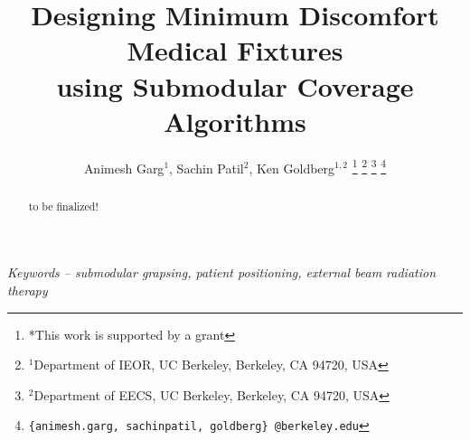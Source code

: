 \documentclass[letterpaper, 10 pt, conference]{ieeeconf}  %
\title{\LARGE \bf
Designing Minimum Discomfort Medical Fixtures \\
using Submodular Coverage Algorithms 
}
\author{Animesh Garg$^{1}$, Sachin Patil$^{2}$, Ken Goldberg$^{1,2}$%
\thanks{*This work is supported by a grant}%
\thanks{$^{1}$Department of IEOR, UC Berkeley,
	Berkeley, CA 94720, USA}%
\thanks{$^{2}$Department of EECS, UC Berkeley,
        Berkeley, CA 94720, USA}%
\thanks{{\tt\small \{animesh.garg, sachinpatil, goldberg\} @berkeley.edu}}%
}
\begin{document}
\maketitle
\thispagestyle{empty}
\pagestyle{empty}


\begin{abstract}
to be finalized!
\end{abstract}

\noindent \textit{ Keywords -- submodular grapsing, patient positioning, 
external beam radiation therapy}










\addtolength{\textheight}{-12cm}  

%
%

%

\end{document}
